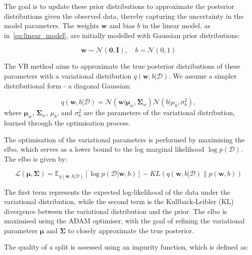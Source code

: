 \documentclass[3p,review,authoryear]{elsarticle}
\begin{document}
The goal is to update these prior distributions to approximate the posterior distributions given the observed data, thereby capturing the uncertainty in the model parameters.
The weights \(\mathbf{w}\) and bias \(b\) in the linear model, as in~\eqref{eq:linear_model}, are initially modelled with Gaussian prior distributions:

\begin{equation}
\mathbf{w} \sim \mathcal{N}(\mathbf{0}, \mathbf{I}), \quad b \sim \mathcal{N}(0, 1)
\end{equation}

The VB method aims to approximate the true posterior distributions of these parameters with a variational distribution \(q(\mathbf{w}, b|\mathcal{D})\).
We assume a simpler distributional form - a diagonal Gaussian:

\begin{equation}
q(\mathbf{w}, b|\mathcal{D}) = \mathcal{N}(\mathbf{w}|\boldsymbol{\mu}_w, \boldsymbol{\Sigma}_w) \mathcal{N}(b|\mu_b, \sigma_b^2),
\end{equation}
where \(\boldsymbol{\mu}_w\), \(\boldsymbol{\Sigma}_w\), \(\mu_b\), and \(\sigma_b^2\) are the parameters of the variational distribution, learned through the optimisation process.

The optimisation of the variational parameters is performed by maximising the \gls{elbo}, which serves as a lower bound to the log marginal likelihood \(\log p(\mathcal{D})\).
The \gls{elbo} is given by:

\begin{equation}
\mathcal{L}(\boldsymbol{\mu}, \boldsymbol{\Sigma}) = \mathbb{E}_{q(\mathbf{w}, b|\mathcal{D})}\left[\log p(\mathcal{D}|\mathbf{w}, b)\right] - KL\left(q(\mathbf{w}, b|\mathcal{D}) \parallel p(\mathbf{w}, b)\right)
\label{eq:elbo}
\end{equation}

The first term represents the expected log-likelihood of the data under the variational distribution, while the second term is the Kullback-Leibler (KL) divergence between the variational distribution and the prior. The \gls{elbo} is maximised using the ADAM optimiser, with the goal of refining the variational parameters \(\boldsymbol{\mu}\) and \(\boldsymbol{\Sigma}\) to closely approximate the true posterior.

The quality of a split is assessed using an impurity function, which is defined as:
\end{document}
